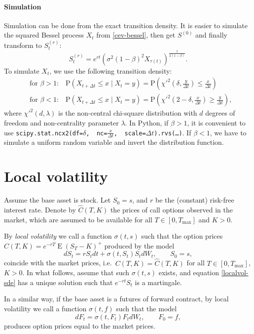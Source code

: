 \documentclass[a4paper,11pt,titlepage]{article}
\renewcommand{\P}{\mathrm{P}}
\DeclareMathOperator{\E}{E}
\renewcommand{\hat}{\widehat}
\theoremstyle{remark}
\begin{document}
\paragraph{Simulation}
Simulation can be done from the exact transition density.
It is easier to simulate the squared Bessel process $X_t$ from \eqref{cev-bessel}, then get $S^{(0)}$ and finally transform to $S_t^{(r)}$:
\[
S_t^{(r)} = e^{rt} (\sigma^2(1-\beta)^2 X_{\tau(t)})^{\frac1{2(1-\beta)}}.
\]
To simulate $X_t$, we use the following transition density:
\begin{align*}
&\text{for $\beta>1$:}\quad 
  \P(X_{t+\Delta t} \le x\mid X_t=y) 
    = \P\left(
        \chi'^2\left(\delta, \frac y{\Delta t}\right) 
        \le \frac{x}{\Delta t}
      \right)\\
&\text{for $\beta<1$:}\quad 
  \P(X_{t+\Delta t} \le x\mid X_t=y) 
    = \P\left(
        \chi'^2\left(2-\delta, \frac x{\Delta t}\right) 
        \ge \frac{y}{\Delta t}
      \right),
\end{align*}
where $\chi'^2(d,\lambda)$ is the non-central chi-square distribution with $d$ degrees of freedom and non-centrality parameter $\lambda$.
In Python, if $\beta>1$, it is convenient to use \texttt{scipy.stat.ncx2(df=$\delta$,\, nc=$\frac{x}{\Delta t}$,\, scale=$\Delta t$).rvs(\ldots)}.
If $\beta<1$, we have to simulate a uniform random variable and invert the distribution function.


\section{Local volatility}
Assume the base asset is stock. Let $S_0=s$, and $r$ be the (constant)
risk-free interest rate. Denote by $\hat C(T,K)$ the prices of call options
observed in the market, which are assumed to be available for all
$T\in[0,T_{\max}]$ and $K>0$.

By \emph{local volatility} we call a function $\sigma(t,s)$ such that the
option prices $C(T,K) = e^{-rT}\E(S_T-K)^+$ produced by the model
\begin{equation}
\label{localvol-sde}
dS_t = rS_t dt + \sigma(t,S_t) S_t dW_t, \qquad S_0 = s,
\end{equation}
coincide with the market prices, i.e.\ $C(T,K) = \hat C(T,K)$ for all
$T\in[0,T_{\max}]$, $K>0$. In what follows, assume that such $\sigma(t,s)$
exists, and equation \eqref{localvol-sde} has a unique solution such that
$e^{-rt}S_t$ is a martingale.

In a similar way, if the base asset is a futures of forward contract, by local
volatility we call a function $\sigma(t,f)$ such that the model
\[
dF_t = \sigma(t,F_t)F_t dW_t, \qquad F_0 = f,
\]
produces option prices equal to the market prices.
\end{document}
